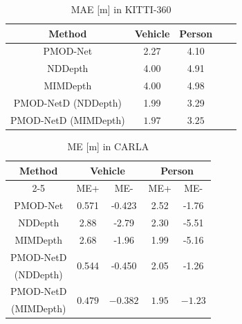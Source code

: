 \begin{table}[t]
  \centering
  \caption{MAE [m] in KITTI-360}
  \label{result_MAE_KITTI-360}
  \begin{tabular}{c|cccc}
      \toprule
      Method                                       & Vehicle            & Person         \\ \midrule
      PMOD-Net\cite{3}                                      & 2.27         & 4.10        \\ \midrule
      NDDepth\cite{1}                                            & 4.00         & 4.91        \\ \midrule
      MIMDepth\cite{2}                                             & 4.00         & 4.98        \\ \midrule
      PMOD-NetD (NDDepth\cite{1})                                           & 1.99         & 3.29        \\ \midrule
      PMOD-NetD (MIMDepth\cite{2})                                            & $\bm{1.97}$         & $\bm{3.25}$        \\ \bottomrule
      \end{tabular}
\end{table}
\begin{table}[t]
  \centering
  \caption{{ME [m] in CARLA}}
  \label{result_ME_CARLA}
  \begin{tabular}{c|cc|cc}
      \toprule
      \multirow{2}{*}{Method}  & \multicolumn{2}{c}{Vehicle} & \multicolumn{2}{c}{Person} \\ \cmidrule{2-5} 
                                             & ME+            & ME-          & ME+           & ME-         \\ \midrule
      PMOD-Net\cite{3}                             & 0.571          & -0.423         & 2.52         & -1.76        \\ \midrule
      NDDepth\cite{1}                                   & 2.88          & -2.79         & 2.30          & -5.51        \\ \midrule
      MIMDepth\cite{2}                                    & 2.68          & -1.96         & 1.99          & -5.16        \\ \midrule
      PMOD-NetD                                  & \multirow{2}{*}{0.544}          & \multirow{2}{*}{-0.450}         & \multirow{2}{*}{2.05}          & \multirow{2}{*}{-1.26}        \\ 
      (NDDepth\cite{1})                        &                                  &                                  &                                  &                                 \\ \midrule
      PMOD-NetD                                   & \multirow{2}{*}{$\bm{0.479}$}          & \multirow{2}{*}{$\bm{-0.382}$}         & \multirow{2}{*}{$\bm{1.95}$}          & \multirow{2}{*}{$\bm{-1.23}$}        \\
      (MIMDepth\cite{2})&                                  &                                  &                                  &                                 \\ \bottomrule
    \end{tabular}
\end{table}
